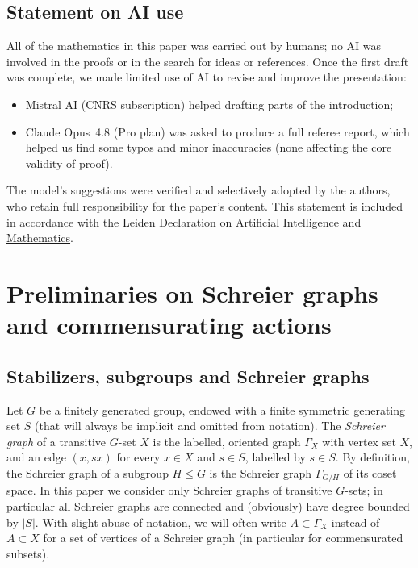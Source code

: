 \documentclass[11pt]{amsart}
\theoremstyle{definition}
\theoremstyle{plain}
\newtheorem{main thm}{Theorem}
\theoremstyle{remark}
\theoremstyle{plain}
\begin{document}
\subsection*{Statement on AI use}
All of the mathematics in this paper was carried out by humans; no AI was involved in the proofs or in the search for ideas or references. Once the first draft was complete, we made limited use of AI to revise and improve the presentation:
\begin{itemize}
 \item Mistral AI
(CNRS subscription) helped drafting parts of the introduction;
\item Claude Opus~4.8 (Pro plan) was asked to produce a full referee report,
which helped us find some typos and minor inaccuracies (none affecting the core validity of proof).
\end{itemize}
The model's suggestions were verified and selectively adopted by the authors, who retain full responsibility for the paper's content. This statement is included
in accordance with the
\href{https://leidendeclaration.ai/}{Leiden Declaration on Artificial
Intelligence and Mathematics}.



\section{Preliminaries on Schreier graphs and commensurating actions} \label{s-preliminaries}
\subsection{Stabilizers, subgroups and Schreier graphs}

Let $G$ be a finitely generated group, endowed with a finite symmetric generating set $S$ (that will always be implicit and omitted from notation). The \emph{Schreier graph} of a transitive $G$-set $X$ is the labelled, oriented graph $\Gamma_X$ with vertex set $X$, and an edge $(x, sx)$ for every $x\in X$ and $s\in S$, labelled by $s\in S$. By definition, the Schreier graph of a subgroup $H\le G$ is the Schreier graph $\Gamma_{G/H}$ of its coset space. In this paper we consider only Schreier graphs of transitive $G$-sets; in particular all Schreier graphs are connected and (obviously) have degree bounded by $|S|$.  With slight abuse of notation, we will often write  $A\subset \Gamma_X$ instead of $A\subset X$ for a set of vertices of a Schreier graph (in particular for commensurated subsets). 
\end{document}
